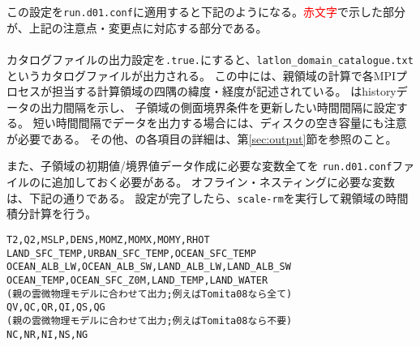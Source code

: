 この設定を\verb|run.d01.conf|に適用すると下記のようになる。\textcolor{red}{赤文字}で示した部分が、上記の注意点・変更点に対応する部分である。\\

\\

カタログファイルの出力設定を\verb|.true.|にすると、\verb|latlon_domain_catalogue.txt|というカタログファイルが出力される。
この中には、親領域の計算で各MPIプロセスが担当する計算領域の四隅の緯度・経度が記述されている。
はhistoryデータの出力間隔を示し、
子領域の側面境界条件を更新したい時間間隔に設定する。
短い時間間隔でデータを出力する場合には、ディスクの空き容量にも注意が必要である。
その他、の各項目の詳細は、第\ref{sec:output}節を参照のこと。

また、子領域の初期値/境界値データ作成に必要な変数全てを
\verb|run.d01.conf|ファイルのに追加しておく必要がある。
オフライン・ネスティングに必要な変数は、下記の通りである。
設定が完了したら、\verb|scale-rm|を実行して親領域の時間積分計算を行う。

\begin{alltt}
  T2, Q2, MSLP, DENS, MOMZ, MOMX, MOMY, RHOT
  LAND_SFC_TEMP, URBAN_SFC_TEMP, OCEAN_SFC_TEMP
  OCEAN_ALB_LW, OCEAN_ALB_SW, LAND_ALB_LW, LAND_ALB_SW
  OCEAN_TEMP, OCEAN_SFC_Z0M, LAND_TEMP, LAND_WATER
(親の雲微物理モデルに合わせて出力; 例えばTomita08なら全て)
  QV, QC, QR, QI, QS, QG
(親の雲微物理モデルに合わせて出力; 例えばTomita08なら不要)
  NC, NR, NI, NS, NG
\end{alltt}



